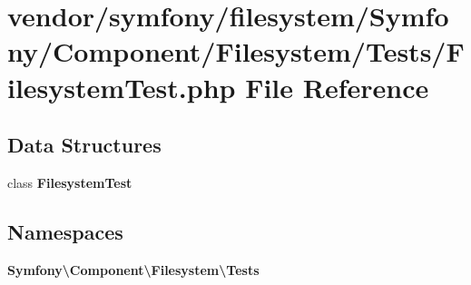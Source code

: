 \section{vendor/symfony/filesystem/\+Symfony/\+Component/\+Filesystem/\+Tests/\+Filesystem\+Test.php File Reference}
\label{_filesystem_test_8php}
\subsection*{Data Structures}
\begin{DoxyCompactItemize}
\item 
class {\bf Filesystem\+Test}
\end{DoxyCompactItemize}
\subsection*{Namespaces}
\begin{DoxyCompactItemize}
\item 
 {\bf Symfony\textbackslash{}\+Component\textbackslash{}\+Filesystem\textbackslash{}\+Tests}
\end{DoxyCompactItemize}

